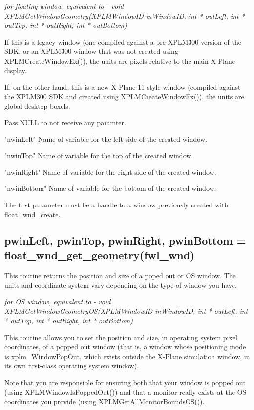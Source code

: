 \documentclass[11pt,parskip=half,a4paper]{scrartcl}
\begin{document}
\emph{for floating window, equivalent to - void XPLMGetWindowGeometry(XPLMWindowID inWindowID, int * outLeft, int * outTop, int * outRight, int * outBottom)}

If this is a legacy window (one compiled against a pre-XPLM300 version of the SDK, or an XPLM300 window that was not created using XPLMCreateWindowEx()), the units are pixels relative to the main X-Plane display.

If, on the other hand, this is a new X-Plane 11-style window (compiled against the XPLM300 SDK and created using XPLMCreateWindowEx()), the units are global desktop boxels.

Pass NULL to not receive any paramter.

"nwinLeft" Name of variable for the left side of the created window.

"nwinTop" Name of variable for the top of the created window.

"nwinRight" Name of variable for the right side of the created window.

"nwinBottom" Name of variable for the bottom of the created window.

The first parameter must be a handle to a window previously created with float\_wnd\_create.

\newpage

\subsection{\hspace*{1.0mm}pwinLeft, pwinTop, pwinRight, pwinBottom = float\_wnd\_get\_geometry(fwl\_wnd)}

This routine returns the position and size of a poped out or OS window. The units and coordinate system vary depending on the type of window you have.

\emph{ for OS window, equivalent to       - void XPLMGetWindowGeometryOS(XPLMWindowID inWindowID, int * outLeft, int * outTop, int * outRight, int * outBottom)}

This routine allows you to set the position and size, in operating system pixel coordinates, of a popped out window (that is, a window whose positioning mode is xplm\_WindowPopOut, which exists outside the X-Plane simulation window, in its own first-class operating system window).

Note that you are responsible for ensuring both that your window is popped out (using XPLMWindowIsPoppedOut()) and that a monitor really exists at the OS coordinates you provide (using XPLMGetAllMonitorBoundsOS()).
\end{document}
